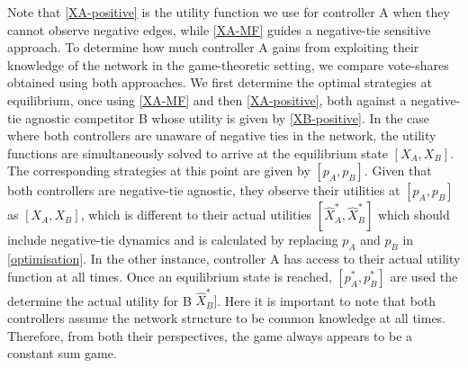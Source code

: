 Note that \cref{XA-positive} is the utility function we use for controller A when they cannot observe negative edges, while \cref{XA-MF} guides a negative-tie sensitive approach.
 To determine how much controller A gains from exploiting their knowledge of the network in the game-theoretic setting, we compare vote-shares obtained using both approaches.
 We first determine the optimal strategies at equilibrium, once using \cref{XA-MF} and then \cref{XA-positive}, both against a negative-tie agnostic competitor B whose utility is given by \cref{XB-positive}. In the case where both controllers are unaware of negative ties in the network, the utility functions are simultaneously solved to arrive at the equilibrium state $[X_{A},X_{B}]$. The corresponding strategies at this point are given by $[p_{A},p_{B}]$. 
 Given that both controllers are negative-tie agnostic, they observe their utilities at $[p_{A},p_{B}]$ as $[X_{A},X_{B}]$, which is different to their actual utilities $[\widehat{X}_{A}^{*},\widehat{X}_{B}^{*}]$ which should include negative-tie dynamics and is calculated by replacing $p_{A}$ and $p_{B}$ in \cref{optimisation}. In the other instance, controller A has access to their actual utility function at all times. Once an equilibrium state is reached, $[p_{A}^*,p_{B}^*]$ are used the determine the actual utility for B $\widehat{X}_{B}^{*}]$. 
 Here it is important to note that both controllers assume the network structure to be common knowledge at all times. Therefore, from both their perspectives, the game always appears to be a constant sum game.
 
